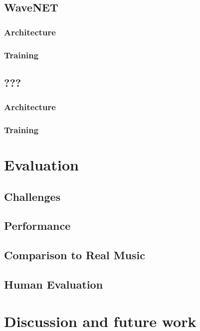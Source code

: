 \documentclass[12pt]{article}
\begin{document}
\subsection{WaveNET}
\subsubsection{Architecture}
\subsubsection{Training}

\subsection{???}
\subsubsection{Architecture}
\subsubsection{Training}

\section{Evaluation}
\subsection{Challenges}
\subsection{Performance}
\subsection{Comparison to Real Music}
\subsection{Human Evaluation}

\section{Discussion and future work}
\end{document}
